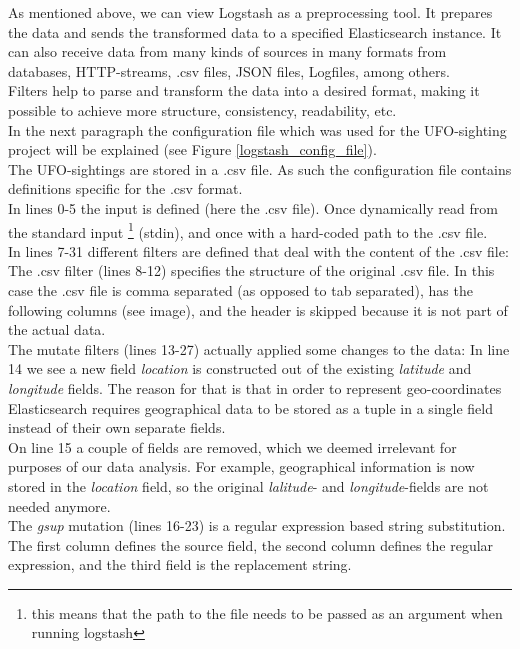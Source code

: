 \documentclass[bibliography=totoc]{article}
\begin{document}
As mentioned above, we can view Logstash as a preprocessing tool.
It prepares the data and sends the transformed data to a specified 
Elasticsearch instance.
It can also receive data from many kinds of sources in many formats from databases, HTTP-streams, 
.csv files, JSON files, Logfiles, among others.
\\
Filters help to parse and transform the data into a
desired format, making it possible to achieve more structure, consistency,
readability, etc.
\\
In the next paragraph the configuration file which was used for the
UFO-sighting project will be explained (see Figure \ref{logstash_config_file}).
\\
The UFO-sightings are stored in a .csv file. As such the configuration file 
contains definitions specific for the .csv format.
\\
In lines 0-5 the input is defined (here the .csv file). Once dynamically read 
from the standard input \footnote{this means that the path to the file needs to be passed as an argument when running logstash} (stdin),
and once with a hard-coded path to the .csv file.
\\
In lines 7-31 different filters are defined that deal with the content 
of the .csv file:
\\
The .csv filter (lines 8-12) specifies the structure of the original .csv file.
In this case the .csv file is comma separated (as opposed to tab separated),
has the following columns (see image), and the header is skipped because
it is not part of the actual data.
\\
The mutate filters (lines 13-27) actually applied some changes to the data:
In line 14 we see a new field \textit{location} is constructed out of the 
existing \textit{latitude} and \textit{longitude} fields. The reason for 
that is that in order to represent geo-coordinates Elasticsearch requires geographical data to be stored as a tuple in a single field instead of their own separate fields.
\\
On line 15 a couple of fields are removed, which we deemed irrelevant
for purposes of our data analysis. For example, geographical information is now 
stored in the \textit{location} field, so the original \textit{lalitude}- and \textit{longitude}-fields
are not needed anymore.
\\
The \textit{gsup} mutation (lines 16-23) is a regular expression based string substitution.
The first column defines the source field, the second column defines the regular expression,
and the third field is the replacement string.
\end{document}
